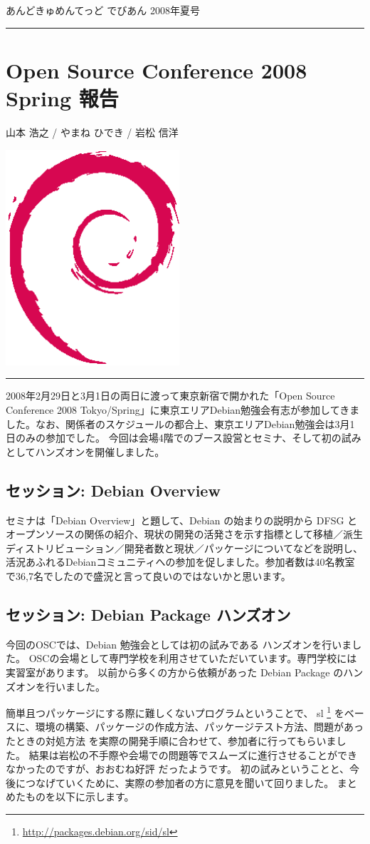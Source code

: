 \documentclass[mingoth,a4paper]{jsarticle}
\renewcommand{\dancersection}[2]{%
\newpage
あんどきゅめんてっど でびあん 2008年夏号
%
\vspace{0.1mm}\\
{\color{dancerlightblue}\rule{\hsize}{2mm}}

%
%
\begin{minipage}[t]{0.6\hsize}
\color{dancerdarkblue}
\vspace{1cm}
\section{#1}
\hfill{}#2\\
\end{minipage}
\begin{minipage}[t]{0.4\hsize}
\vspace{-2cm}
\hfill{}\includegraphics[height=8cm]{image200502/openlogo-nd.eps}\\
\vspace{-5cm}
\end{minipage}
%
%
{\color{dancerdarkblue}\rule{0.74\hsize}{2mm}}
%
\vspace{2cm}
}
\begin{document}
\dancersection{Open Source Conference 2008 Spring 報告}{山本 浩之 / やまね ひでき / 岩松 信洋}
\label{sec:osc2008spring}

2008年2月29日と3月1日の両日に渡って東京新宿で開かれた「Open Source Conference 2008 Tokyo/Spring」に東京エリアDebian勉強会有志が参加してきました。なお、関係者のスケジュールの都合上、東京エリアDebian勉強会は3月1日のみの参加でした。
今回は会場4階でのブース設営とセミナ、そして初の試みとしてハンズオンを開催しました。

\subsection{セッション: Debian Overview}
セミナは「Debian Overview」と題して、Debian の始まりの説明から DFSG とオープンソースの関係の紹介、現状の開発の活発さを示す指標として移植／派生ディストリビューション／開発者数と現状／パッケージについてなどを説明し、活況あふれるDebianコミュニティへの参加を促しました。参加者数は40名教室で36,7名でしたので盛況と言って良いのではないかと思います。

\subsection{セッション: Debian Package ハンズオン}
今回のOSCでは、Debian 勉強会としては初の試みである ハンズオンを行いました。
OSCの会場として専門学校を利用させていただいています。専門学校には実習室があります。
以前から多くの方から依頼があった Debian Package のハンズオンを行いました。

簡単且つパッケージにする際に難しくないプログラムということで、
sl \footnote{\url{http://packages.debian.org/sid/sl}}
をベースに、環境の構築、パッケージの作成方法、パッケージテスト方法、問題があったときの対処方法
を実際の開発手順に合わせて、参加者に行ってもらいました。
結果は岩松の不手際や会場での問題等でスムーズに進行させることができなかったのですが、おおむね好評
だったようです。
初の試みということと、今後につなげていくために、実際の参加者の方に意見を聞いて回りました。
まとめたものを以下に示します。
\end{document}
